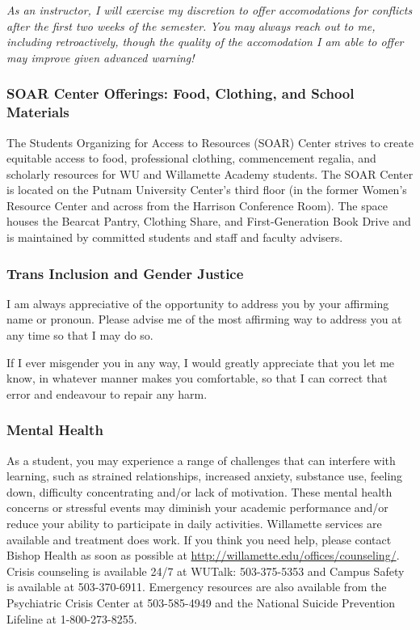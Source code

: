 \textit{As an instructor, I will exercise my discretion to offer accomodations for conflicts after the first two weeks of the semester. You may always reach out to me, including retroactively, though the quality of the accomodation I am able to offer may improve given advanced warning!}

\subsubsection*{SOAR Center Offerings: Food, Clothing, and School Materials}

The Students Organizing for Access to Resources (SOAR) Center strives to create equitable access to food, professional clothing, commencement regalia, and scholarly resources for WU and Willamette Academy students. The SOAR Center is located on the Putnam University Center's third floor (in the former Women's Resource Center and across from the Harrison Conference Room). The space houses the Bearcat Pantry, Clothing Share, and First-Generation Book Drive and is maintained by committed students and staff and faculty advisers.

\subsubsection*{Trans Inclusion and Gender Justice}

I am always appreciative of the opportunity to address you by your affirming name or pronoun. Please advise me of the most affirming way to address you at any time so that I may do so.

If I ever misgender you in any way, I would greatly appreciate that you let me know, in whatever manner makes you comfortable, so that I can correct that error and endeavour to repair any harm. 

\subsubsection*{Mental Health}
As a student, you may experience a range of challenges that can interfere with learning, such as strained
relationships, increased anxiety, substance use, feeling down, difficulty concentrating and/or lack of
motivation. These mental health concerns or stressful events may diminish your academic performance and/or
reduce your ability to participate in daily activities. Willamette services are available and treatment does work.
If you think you need help, please contact Bishop Health as soon as possible at
\url{http://willamette.edu/offices/counseling/}. Crisis counseling is available 24/7 at WUTalk: 503-375-5353 and
Campus Safety is available at 503-370-6911. Emergency resources are also available from the Psychiatric
Crisis Center at 503-585-4949 and the National Suicide Prevention Lifeline at 1-800-273-8255.
